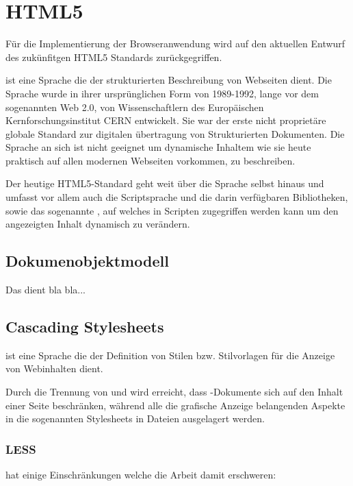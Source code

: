 \section{HTML5}

Für die Implementierung der Browseranwendung wird auf den aktuellen Entwurf des  zukünfitgen HTML5
Standards zurückgegriffen. \cite{html5}

 ist eine Sprache die der strukturierten  Beschreibung von Webseiten dient. Die Sprache
wurde in ihrer ursprünglichen Form  von 1989-1992, lange vor dem sogenannten Web 2.0, von
Wissenschaftlern des  Europäischen Kernforschungsinstitut CERN entwickelt. Sie war der erste nicht
proprietäre globale Standard zur digitalen übertragung von Strukturierten  Dokumenten. Die Sprache
 an sich ist nicht geeignet um dynamische Inhaltem  wie sie heute praktisch auf allen
modernen Webseiten vorkommen, zu beschreiben.

Der heutige HTML5-Standard geht weit über die Sprache  selbst hinaus und  umfasst vor
allem auch die Scriptsprache  und die darin verfügbaren  Bibliotheken, sowie das
sogenannte , auf welches in  Scripten zugegriffen werden kann um den angezeigten Inhalt
dynamisch zu  verändern.

\subsection{Dokumenobjektmodell}

Das  dient bla bla...

\subsection{Cascading Stylesheets}

 ist eine Sprache die der Definition von  Stilen bzw.
Stilvorlagen für die Anzeige von Webinhalten dient.

Durch die Trennung von  und  wird erreicht, dass -Dokumente sich auf  den
Inhalt einer Seite beschränken, während alle die grafische Anzeige  belangenden Aspekte in die
sogenannten Stylesheets in  Dateien ausgelagert  werden.

\subsubsection{LESS}

 hat einige Einschränkungen welche die Arbeit damit erschweren:

